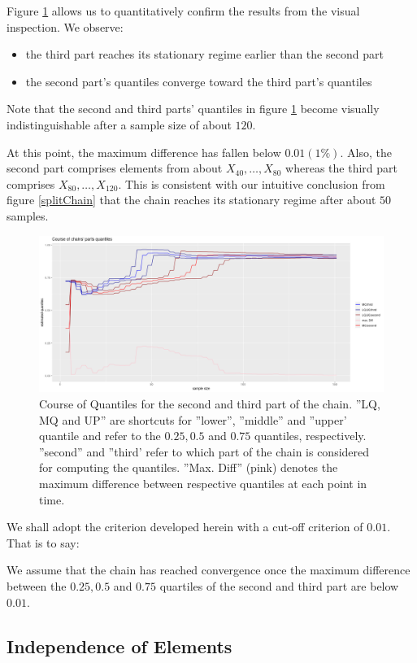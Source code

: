 Figure \ref{splitChainQuantileCourse} allows us to quantitatively confirm the results from the visual inspection. We observe:
\begin{itemize}
	\item the third part reaches its stationary regime earlier than the second part
	\item the second part's quantiles converge toward the third part's quantiles
\end{itemize}

Note that the second and third parts' quantiles in figure \ref{splitChainQuantileCourse} become visually indistinguishable after a sample size of about $120$. 

At this point, the maximum difference has fallen below $0.01 (1\%)$. 
Also, the second part comprises elements from about $X_{40}, \dots, X_{80}$ whereas the third part comprises $X_{80}, \dots, X_{120}$. This is consistent with our intuitive conclusion from figure \ref{splitChain} that the chain reaches its stationary regime after about $50$ samples. 

\begin{figure}
	\includegraphics[width=\linewidth]{Images/chain_part_quantiles.png}
	\caption{Course of Quantiles for the second and third part of the chain. ''LQ, MQ and UP'' are shortcuts for ''lower'', ''middle'' and ''upper' quantile and refer to the $0.25, 0.5$ and $0.75$ quantiles, respectively. ''second'' and ''third' refer to which part of the chain is considered for computing the quantiles. ''Max. Diff'' (pink) denotes the maximum difference between respective quantiles at each point in time. }
	\label{splitChainQuantileCourse}
\end{figure}

We shall adopt the criterion developed herein with a cut-off criterion of $0.01$. That is to say: 

\begin{center}
We assume that the chain has reached convergence once the maximum difference between the $0.25, 0.5$ and $0.75$ quartiles of the second and third part are below $0.01$. 
\end{center}

\subsection{Independence of Elements}

